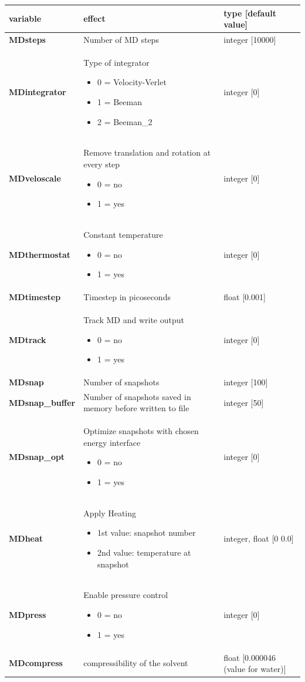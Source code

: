 \documentclass[10pt,a4paper]{article} %
\begin{document}
	\begin{tabularx}{\textwidth}{l|X|X}
		variable & effect & type [default value] \\
		\hline
		\textbf{MDsteps} & Number of MD steps & integer [10000] \\
		\textbf{MDintegrator} & Type of integrator \begin{itemize}
			\item 0  = Velocity-Verlet \item 1 = Beeman \item 2 = Beeman\_2
			\end{itemize} 	
		& integer [0] \\
		\textbf{MDveloscale} & Remove translation and rotation at every step\begin{itemize} \item 0 = no \item 1 = yes\end{itemize}& integer [0] \\
		\textbf{MDthermostat} & Constant temperature\begin{itemize} \item 0 = no \item 1 = yes\end{itemize}
		 & integer [0] \\
		\textbf{MDtimestep} & Timestep in picoseconds & float [0.001] \\
		\textbf{MDtrack} & Track MD and write output\begin{itemize} \item 0 = no \item 1 = yes\end{itemize}& integer [0] \\
		\textbf{MDsnap} & Number of snapshots & integer [100] \\
		\textbf{MDsnap\_buffer} & Number of snapshots saved in memory before written to file & integer [50] \\
		\textbf{MDsnap\_opt} & Optimize snapshots with chosen energy interface\begin{itemize} \item 0 = no \item 1 = yes\end{itemize} & integer [0] \\
		\textbf{MDheat}  & Apply Heating \begin{itemize}\item1st value: snapshot number\item2nd value: temperature at snapshot\end{itemize} & integer, float [0 0.0]\\
		\textbf{MDpress} & Enable pressure control\begin{itemize} \item 0 = no \item 1 = yes\end{itemize}& integer [0]\\
		\textbf{MDcompress} & compressibility of the solvent & float [0.000046 (value for water)] 
	\end{tabularx} ~\\ 
	
\end{document}
